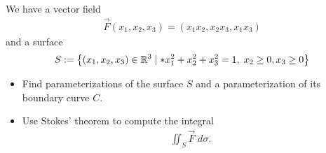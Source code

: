 \documentclass[11pt]{article}
\begin{document}
\begin{exercise}
    We have a vector field 
    \begin{align*}
        \vec F( x_1, x_2, x_3 ) = \left( x_1 x_2, x_2 x_3, x_1 x_3 \right)
    \end{align*}
    and a surface 
    \begin{align*}
        S := \left\{ (x_1,x_2,x_3) \in \bbR^{3} \suchthat* x_1^2 + x_2^2 + x_3^2 = 1, \; x_2 \geq 0, x_3 \geq 0 \right\} 
    \end{align*}
    \begin{itemize}
        \item Find parameterizations of the surface $S$ and a parameterization of its boundary curve $C$.
        \item Use Stokes' theorem to compute the integral 
        \begin{align*}
            \iint_{S} \vec F \;d\sigma.
        \end{align*}
    \end{itemize}
\end{exercise}
\begin{solution}     
\end{solution}













% 
% 
% 
\end{document}
